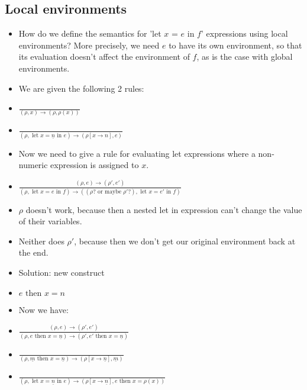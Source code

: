 \documentclass{article}
\begin{document}
\subsection{Local environments}
\begin{itemize}
	\item How do we define the semantics for 'let $x$ = $e$ in $f$' expressions using local environments? More precisely, we need $e$ to have its own environment, so that its evaluation doesn't affect the environment of $f$, as is the case with global environments.
	\item We are given the following 2 rules:
	\item $\frac{}{ (\rho, x)\rightarrow(\rho, \rho(x)) }$
	\item $\frac{}{(\rho, \text{ let }x = \underline{n}\text{ in }e)\rightarrow(\rho[x\rightarrow n], e) }$
	\item Now we need to give a rule for evaluating let expressions where a non-numeric expression is assigned to $x$.
	\item $\frac{ (\rho, e)\rightarrow(\rho', e') }
	{ (\rho, \text{ let }x = e\text{ in }f)\rightarrow((\rho?\text{ or maybe }\rho'?), \text{ let } x = e'\text{ in }f) }$
	\item $ \rho $ doesn't work, because then a nested let in expression can't change the value of their variables.
	\item Neither does $ \rho' $, because then we don't get our original environment back at the end.
	\item Solution: new construct
	\item $ e \text{ then }x=n $
	\item Now we have:
	\item $\frac{ (\rho, e)\rightarrow(\rho', e') }
	{ (\rho, e\text{ then }x = \underline{n})\rightarrow(\rho', e'\text{ then } x=\underline{n}) }$
	\item $\frac{}{ (\rho, \underline m\text{ then }x=\underline{n})\rightarrow(\rho[x\rightarrow \underline{n}], \underline{m}) }$
	\item $\frac{}{(\rho, \text{ let }x = \underline{n}\text{ in }e)\rightarrow(\rho[x\rightarrow \underline{n}], e\text{ then }x=\rho(x)) }$
\end{itemize}
\end{document}
